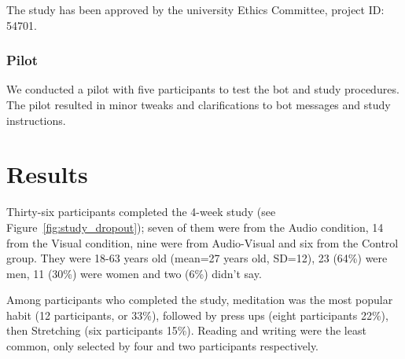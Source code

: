 \documentclass{scaffold/sigchi}
\begin{document}
The study has been approved by the university Ethics Committee, project ID: 54701.

\subsubsection{Pilot}
We conducted a pilot with five participants to test the bot and study procedures. The pilot resulted in minor tweaks and clarifications to bot messages and study instructions.

\section{Results}
Thirty-six participants completed the 4-week study (see Figure~\ref{fig:study_dropout}); seven of them were from the Audio condition, 14 from the Visual condition, nine were from Audio-Visual and six from the Control group. They were 18-63 years old (mean=27 years old, SD=12), 23 (64\%) were men, 11 (30\%) were women and two (6\%) didn't say. 

Among participants who completed the study, meditation was the most popular habit (12 participants, or 33\%), followed by press ups (eight participants 22\%), then Stretching (six participants 15\%). Reading and writing were the least common, only selected by four and two participants respectively.


\end{document}
